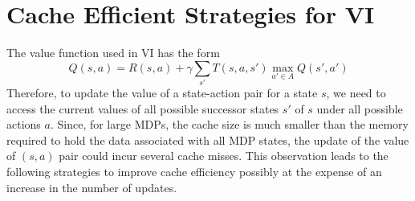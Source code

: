 \documentclass[conference]{IEEEtran}
\begin{document}
\section{Cache Efficient Strategies for VI}
\label{sec:CacheStrategies}
The value function used in VI has the form
\begin{equation}
Q(s,a)=R(s,a) + \gamma \sum\limits_{s'} T(s,a,s')  {\displaystyle\max_{a'\in A} }  Q(s',a') \label{eq}
\end{equation}
Therefore, to update the value of a state-action pair for a state $s$,
we need to access the current values of all possible successor states $s'$ of $s$ under all possible actions $a$.
Since, for large MDPs, the cache size is much smaller than the memory
required to hold the data associated with all MDP states, the update of the value of $(s,a)$ pair could incur several cache misses.
This observation leads to the following strategies to improve cache efficiency possibly at the expense of an increase in the number of updates.
\end{document}
